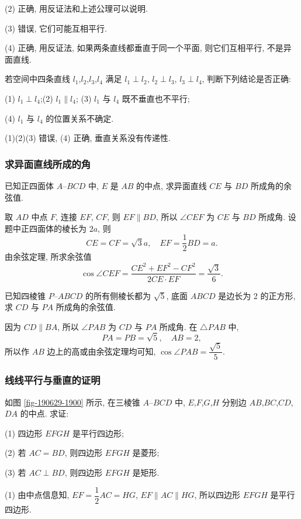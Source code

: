     (2) 正确, 用反证法和上述公理可以说明.

    (3) 错误, 它们可能互相平行.

    (4) 正确, 用反证法, 如果两条直线都垂直于同一个平面, 则它们互相平行, 不是异面直线.
\endsolution

\lianxi
\begin{exercise}[s]
    若空间中四条直线 $l_1$,$l_2$,$l_3$,$l_4$ 满足 $l_1\perp l_2$, $l_2\perp l_3$, $l_3\perp l_4$, 判断下列结论是否正确:
    
    (1) $l_1\perp l_4$;\qquad (2) $l_1\parallel l_4$;\qquad
    (3) $l_1$ 与 $l_4$ 既不垂直也不平行; 
    
    (4) $l_1$ 与 $l_4$ 的位置关系不确定.
\end{exercise}
\beginsolution
    (1)(2)(3) 错误, (4) 正确, 垂直关系没有传递性.
\endsolution

\subsubsection{求异面直线所成的角}
\begin{example}
    已知正四面体 $A\text{--}BCD$ 中, $E$ 是 $AB$ 的中点, 求异面直线 $CE$ 与 $BD$ 所成角的余弦值.
\end{example}
\beginsolution
    取 $AD$ 中点 $F$, 连接 $EF$, $CF$, 
    则 $EF\parallel BD$, 所以 $\angle CEF$ 为 $CE$ 与 $BD$ 所成角. 设题中正四面体的棱长为 $2a$, 则 
    \[CE=CF= \sqrt3a,\quad EF=\frac12 BD= a.\]
    由余弦定理, 
    所求余弦值
    \[\cos\angle CEF= \frac{CE^2+EF^2- CF^2}{2CE\cdot EF}
        = \frac{\sqrt3}{6}.\]
\endsolution

\lianxi
\begin{exercise}[s]
    已知四棱锥 $P\text{--}ABCD$ 的所有侧棱长都为 $\sqrt5$, 底面 $ABCD$ 是边长为 2 的正方形, 求 $CD$ 与 $PA$ 所成角的余弦值.
\end{exercise}
\beginsolution
    因为 $CD\parallel BA$, 所以 $\angle PAB$ 为 $CD$ 与 $PA$ 所成角. 在 $\triangle PAB$ 中, 
    \[PA=PB=\sqrt5,\quad AB=2,\]
    所以作 $AB$ 边上的高或由余弦定理均可知, $\cos\angle PAB= \dfrac{\sqrt5}{5}$.
\endsolution
    
\subsubsection{线线平行与垂直的证明}
\begin{example}
    如图 \ref{fig-190629-1900} 所示, 在三棱锥 $A\text{--}BCD$ 中, $E$,$F$,$G$,$H$ 分别边 $AB$,$BC$,$CD$,$DA$ 的中点. 求证:
    
    (1) 四边形 $EFGH$ 是平行四边形;
    
    (2) 若 $AC=BD$, 则四边形 $EFGH$ 是菱形;
    
    (3) 若 $AC\perp BD$, 则四边形 $EFGH$ 是矩形.
\end{example}
\beginsolution
    (1) 由中点信息知, $EF=\dfrac12 AC=HG$, $EF\parallel AC\parallel HG$, 所以四边形 $EFGH$ 是平行四边形.

